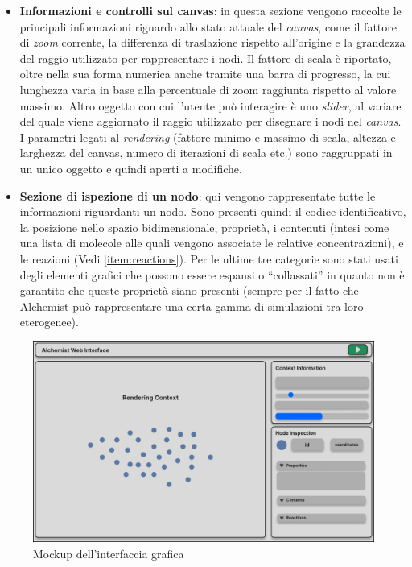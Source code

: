 \begin{itemize}
	\item \textbf{Informazioni e controlli sul canvas}: in questa sezione vengono raccolte le principali informazioni riguardo allo stato attuale del \textit{canvas}, come il fattore di \textit{zoom} corrente, la differenza di traslazione rispetto all'origine e la grandezza del raggio utilizzato per rappresentare i nodi. Il fattore di scala è riportato, oltre nella sua forma numerica anche tramite una barra di progresso, la cui lunghezza varia in base alla percentuale di zoom raggiunta rispetto al valore massimo. Altro oggetto con cui l'utente può interagire è uno \textit{slider}, al variare del quale viene aggiornato il raggio utilizzato per disegnare i nodi nel \textit{canvas}. I parametri legati al \textit{rendering} (fattore minimo e massimo di scala, altezza e larghezza del canvas, numero di iterazioni di scala etc.) sono raggruppati in un unico oggetto e quindi aperti a modifiche.
	\item \textbf{Sezione di ispezione di un nodo}\label{item:node-inspection}: qui vengono rappresentate tutte le informazioni riguardanti un nodo. Sono presenti quindi il codice identificativo, la posizione nello spazio bidimensionale, proprietà, i contenuti (intesi come una lista di molecole alle quali vengono associate le relative concentrazioni), e le reazioni (Vedi \cref{item:reactions}). Per le ultime tre categorie sono stati usati degli elementi grafici che possono essere espansi o ``collassati'' in quanto non è garantito che queste proprietà siano presenti (sempre per il fatto che Alchemist può rappresentare una certa gamma di simulazioni tra loro eterogenee).
\end{itemize}

\begin{figure}[htb]
	\centering
	\includegraphics[scale=0.65]{imgs/Interface_Layout.pdf}
	\caption{Mockup dell'interfaccia grafica}
	\label{fig:interface-layout}
\end{figure}

